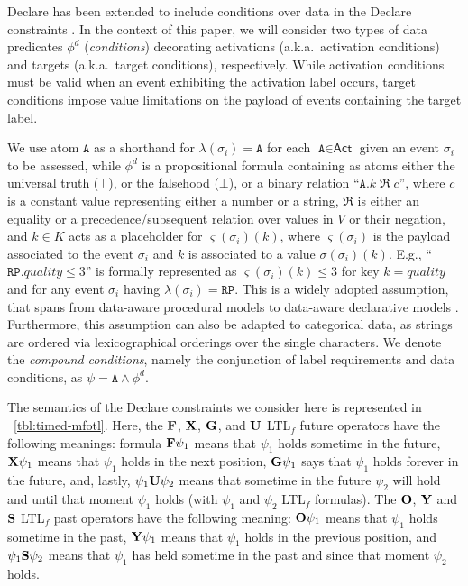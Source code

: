 Declare has been extended to include conditions over data in the Declare constraints \cite{BurattinMS16}. In the context of this paper, we will consider two types of data predicates $\phi^d$ (\textit{conditions}) decorating activations (a.k.a.\ activation conditions) and targets (a.k.a.\ target conditions), respectively.
While activation conditions must be valid when an event exhibiting the activation label occurs, target conditions impose value limitations on the payload of events containing the target label.


We use atom $\texttt{A}$ as a shorthand for $\lambda(\sigma_i)=\texttt{A}$ for each $\texttt{A}\in\textsf{Act}$ given an event $\sigma_i$ to be assessed, while $\phi^d$ is a propositional formula containing as atoms either the universal truth ($\top$), or the falsehood ($\bot$), or a binary relation ``$\texttt{A}.k\;\Re\;c$'', where $c$ is a constant value representing either a number or a string, $\Re$ is either an equality or a precedence/subsequent relation over values in $V$ or their negation, and $k\in K$ acts as a placeholder for $\varsigma(\sigma_i)(k)$, where $\varsigma(\sigma_i)$ is the payload associated to the event $\sigma_i$ and $k$ is associated to a value $\sigma(\sigma_i)(k)$. E.g., ``$\texttt{RP}.\textit{quality}\leq 3$'' is formally represented as $\varsigma(\sigma_i)(k)\leq 3$ for key $k=quality$ and for any event $\sigma_i$ having $\lambda(\sigma_i)=\texttt{RP}$.  This is a widely adopted assumption, that spans from data-aware procedural models \cite{MultiPerspective} to data-aware declarative models \cite{BurattinMS16}. Furthermore, this assumption can also be adapted to categorical data, as strings are ordered via lexicographical orderings over the single characters. We denote the \textit{compound conditions}, namely the conjunction of label requirements and data conditions, as $\psi=\texttt{A}\wedge \phi^d$.



The semantics of the Declare constraints we consider here is represented in \tablename~\ref{tbl:timed-mfotl}.
Here, the $\mathbf{F}$, $\mathbf{X}$, $\mathbf{G}$, and $\mathbf{U}$ LTL$_f$ future operators have the following meanings: formula $\mathbf{F} \psi_1$ means that $\psi_1$ holds sometime in the future, $\mathbf{X} \psi_1$ means that $\psi_1$
holds in the next position, $\mathbf{G} \psi_1$ says that $\psi_1$ holds forever in the future, and, lastly, $\psi_1 \mathbf{U} \psi_2$ means that sometime in the future $\psi_2$ will hold and
until that moment $\psi_1$ holds (with $\psi_1$ and $\psi_2$ LTL$_f$ formulas).
The $\mathbf{O}$, $\mathbf{Y}$ and $\mathbf{S}$ LTL$_f$ past operators have the following meaning:
$\mathbf{O} \psi_1$ means that $\psi_1$ holds sometime in the past,
$\mathbf{Y} \psi_1$ means that $\psi_1$ holds in the previous position,
and $\psi_1 \mathbf{S} \psi_2$ means that $\psi_1$ has held sometime in the past and since that moment $\psi_2$ holds.

